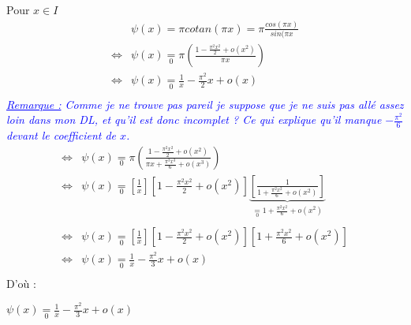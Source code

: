 Pour $x \in I$
\[
  \begin{array}{rl}
         & \psi(x) = \pi cotan(\pi x) = \pi \frac{cos(\pi x)}{sin(\pi x}                       \\
    \iff & \psi(x) \underset{0}{=} \pi \left(\frac{1-\frac{\pi^2 x^2}{2}+o(x^2)}{\pi x}\right) \\
    \iff & \psi(x) \underset{0}{=} \frac{1}{x}-\frac{\pi^2}{2}x+o(x)                           \\
  \end{array}
\]
\textcolor{Blue}{\textit{\ul{Remarque :} Comme je ne trouve pas pareil je suppose que je ne suis pas allé assez loin dans mon DL, et qu'il est donc incomplet ? Ce qui explique qu'il manque $-\frac{\pi^2}{6}$ devant le coefficient de $x$.}}
\[
  \begin{array}{rl}
    \iff & \psi(x) \underset{0}{=} \pi \left(\frac{1-\frac{\pi^2 x^2}{2}+o(x^2)}{\pi x + \frac{\pi^3 x^3}{6} + o(x^3)}\right) \\
    \iff & \psi(x) \underset{0}{=} \left[ \frac{1}{x} \right]
    \left[ 1-\frac{\pi^2 x^2}{2}+o(x^2) \right]
    \underbrace{\left[ \frac{1}{1 + \frac{\pi^2 x^2}{6} + o(x^2)} \right]}_{\underset{0}{=}1 +  \frac{\pi^2 x^2}{6} + o(x^2)}
    \\\\
    \iff & \psi(x) \underset{0}{=} \left[ \frac{1}{x} \right]
    \left[1-\frac{\pi^2 x^2}{2}+o(x^2) \right]
    \left[1 +  \frac{\pi^2 x^2}{6} + o(x^2) \right]
    \\
    \iff & \psi(x) \underset{0}{=} \frac{1}{x} - \frac{\pi^2}{3}x+o(x)                                                        \\
  \end{array}
\]
D'où :
\begin{result}
  $\psi(x) \underset{0}{=} \frac{1}{x} - \frac{\pi^2}{3}x+o(x)$
\end{result}
